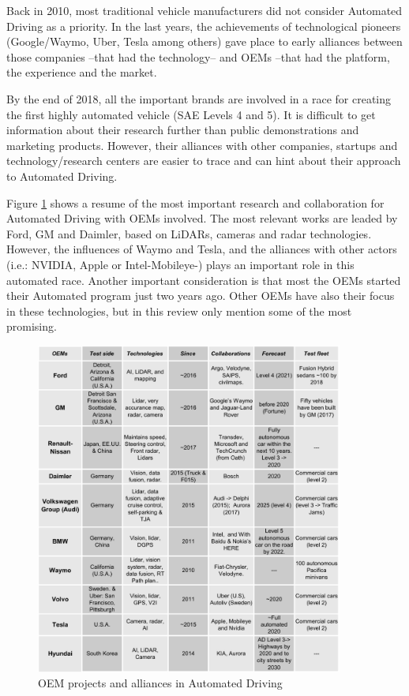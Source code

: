 Back in 2010, most traditional vehicle manufacturers did not consider Automated
Driving as a priority. In the last years, the achievements of technological 
pioneers (Google/Waymo, Uber, Tesla among others) gave place to early alliances
between those companies --that had the technology-- and OEMs --that had the
platform, the experience and the market.

By the end of 2018, all the important brands are involved in a race for creating
the first highly automated vehicle (SAE Levels 4 and 5). It is difficult to
get information about their research further than public demonstrations and
marketing products. However, their alliances with other companies, startups
and technology/research centers are easier to trace and can hint about their 
approach to Automated Driving.


Figure \ref{fig:oem-ad} shows a resume of the most important research and collaboration for Automated Driving with OEMs involved. The most relevant works are leaded by Ford, GM and Daimler, based on LiDARs, cameras and radar technologies. However, the influences of Waymo and Tesla, and the alliances with other actors (i.e.: NVIDIA, Apple or Intel-Mobileye-) plays an important role in this automated race. Another important consideration is that most the OEMs started their Automated program just two years ago. Other OEMs have also their focus in these technologies, but in this review only mention some of the most promising.

\begin{figure}[t]
    \centering
    \includegraphics[width=0.9\textwidth]{"img/OEM_jp_trim"}
    \caption{OEM projects and alliances in Automated Driving}
    \label{fig:oem-ad}
\end{figure}

